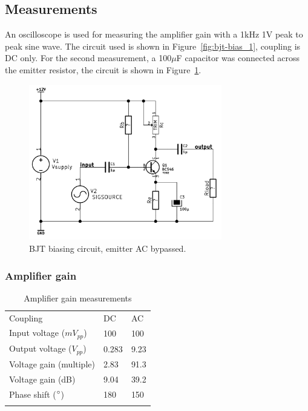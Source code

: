 \documentclass[11pt,a4paper]{article}
\begin{document}
\subsection{Measurements}\label{bjt-measurements}
An oscilloscope is used for measuring the amplifier gain with a 1kHz 1V peak to
peak sine wave. The circuit used is shown in Figure~\ref{fig:bjt-bias_1}, 
coupling is DC only. For the second measurement, a 100$\mu$F capacitor was connected
across the emitter resistor, the circuit is shown in Figure~\ref{fig:bjt-bias_2AC}.

\begin{figure}[htbp]
    \centering
    \includegraphics[width=0.75\textwidth]{img/bjt-bias_2AC.png}
    \caption{BJT biasing circuit, emitter AC bypassed.}
    \label{fig:bjt-bias_2AC}
\end{figure}

\subsubsection{Amplifier gain}\label{amplifier-gain}
\begin{longtable}[c]{lll}
\toprule\addlinespace
Coupling & DC & AC
\\\addlinespace
\midrule\endhead
Input voltage ($mV_{pp}$) & 100 & 100
\\\addlinespace
Output voltage ($V_{pp}$) & 0.283 & 9.23
\\\addlinespace
Voltage gain (multiple) & 2.83 & 91.3
\\\addlinespace
Voltage gain (dB) & 9.04 & 39.2
\\\addlinespace
Phase shift ($\degree$) & 180 & 150
\\\addlinespace
\bottomrule
\addlinespace
\caption{Amplifier gain measurements}
\end{longtable}
\end{document}
